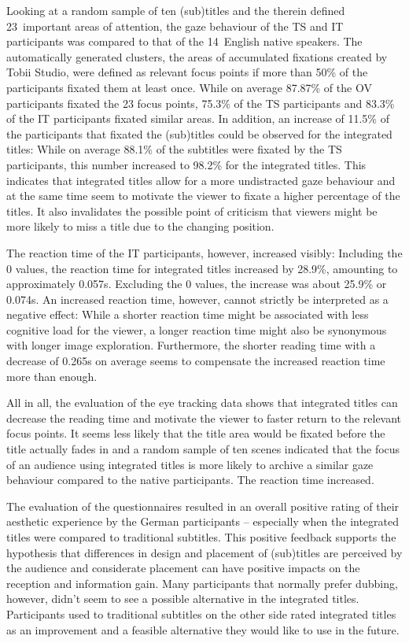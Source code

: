 \documentclass[output=paper]{langsci/langscibook}
\begin{document}
Looking at a random sample of ten (sub)titles and the therein defined 23~important areas of attention, the gaze behaviour of the TS and IT participants was compared to that of the 14~English native speakers. The automatically generated clusters, the areas of accumulated fixations created by Tobii Studio, were defined as relevant focus points if more than 50\% of the participants fixated them at least once. While on average 87.87\% of the OV participants fixated the 23 focus points, 75.3\% of the TS participants and 83.3\% of the IT participants fixated similar areas. In addition, an increase of 11.5\% of the participants that fixated the (sub)titles could be observed for the integrated titles: While on average 88.1\% of the subtitles were fixated by the TS participants, this number increased to 98.2\% for the integrated titles. This indicates that integrated titles allow for a more undistracted gaze behaviour and at the same time seem to motivate the viewer to fixate a higher percentage of the titles. It also invalidates the possible point of criticism that viewers might be more likely to miss a title due to the changing position.



The reaction time of the IT participants, however, increased visibly: Including the 0 values, the reaction time for integrated titles increased by 28.9\%, amounting to approximately 0.057s. Excluding the 0 values, the increase was about 25.9\% or 0.074s. An increased reaction time, however, cannot strictly be interpreted as a negative effect: While a shorter reaction time might be associated with less cognitive load for the viewer, a longer reaction time might also be synonymous with longer image exploration. Furthermore, the shorter reading time with a decrease of 0.265s on average seems to compensate the increased reaction time more than enough.



All in all, the evaluation of the eye tracking data shows that integrated titles can decrease the reading time and motivate the viewer to faster return to the relevant focus points. It seems less likely that the title area would be fixated before the title actually fades in and a random sample of ten scenes indicated that the focus of an audience using integrated titles is more likely to archive a similar gaze behaviour compared to the native participants. The reaction time increased.



The evaluation of the questionnaires resulted in an overall positive rating of their aesthetic experience by the German participants – especially when the integrated titles were compared to traditional subtitles. This positive feedback supports the hypothesis that differences in design and placement of (sub)titles are perceived by the audience and considerate placement can have positive impacts on the reception and information gain. Many participants that normally prefer dubbing, however, didn't seem to see a possible alternative in the integrated titles. Participants used to traditional subtitles on the other side rated integrated titles as an improvement and a feasible alternative they would like to use in the future.
\end{document}
